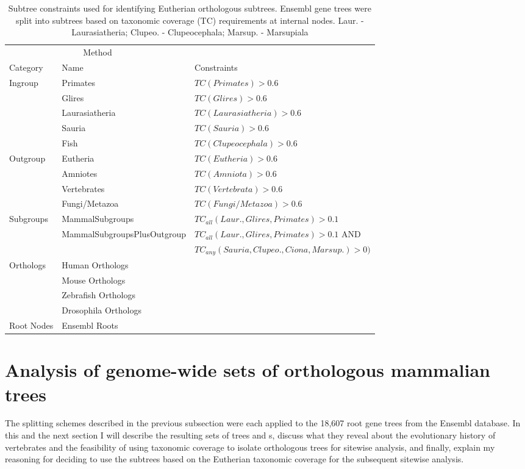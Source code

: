 \begin{table}[ht] \footnotesize
\centering
\begin{tabular}{@{}lll@{}} \toprule
\multicolumn{2}{c}{Method} \\ \cmidrule(r){1-2}
   Category & Name & Constraints \\ \midrule
Ingroup & Primates & $TC(Primates) > 0.6$ \\
 &   Glires &  $TC(Glires) > 0.6$ \\
 &   Laurasiatheria & $TC(Laurasiatheria) > 0.6$ \\
 &   Sauria & $TC(Sauria) > 0.6$ \\
 &   Fish & $TC(Clupeocephala) > 0.6$ \\
Outgroup &  Eutheria & $TC(Eutheria) > 0.6$ \\
 &   Amniotes & $TC(Amniota) > 0.6$\\
 &   Vertebrates & $TC(Vertebrata) > 0.6$\\
 &   Fungi/Metazoa & $TC(Fungi/Metazoa) > 0.6$\\
Subgroups &  MammalSubgroups & $TC_{all}(Laur., Glires, Primates) > 0.1$\\
 &   \scriptsize{MammalSubgroupsPlusOutgroup} & $TC_{all}(Laur., Glires, Primates) > 0.1$ AND \\
 &    & $TC_{any}(Sauria, Clupeo., Ciona, Marsup.) > 0)$ \\
Orthologs & Human Orthologs & \\
 &   Mouse Orthologs &  \\
 &   Zebrafish Orthologs &  \\
 &   Drosophila Orthologs &  \\
Root Nodes & Ensembl Roots &  \\
\bottomrule
\end{tabular}
\caption{Subtree constraints used for identifying Eutherian
  orthologous subtrees. Ensembl gene trees were split into subtrees
  based on taxonomic coverage (TC) requirements at internal
  nodes. Laur. - Laurasiatheria; Clupeo. - Clupeocephala; Marsup. -
  Marsupiala}
\label{subtree_constraints}
\end{table}

\section{Analysis of genome-wide sets of orthologous mammalian trees}

The \subtr splitting schemes described in the previous subsection were
each applied to the 18,607 root gene trees from the Ensembl
database. In this and the next section I will describe the resulting
sets of trees and \subtr{}s, discuss what they reveal about the
evolutionary history of vertebrates and the feasibility of using
taxonomic coverage to isolate orthologous trees for sitewise analysis,
and finally, explain my reasoning for deciding to use the subtrees
based on the Eutherian taxonomic coverage for the subsequent sitewise
analysis.

